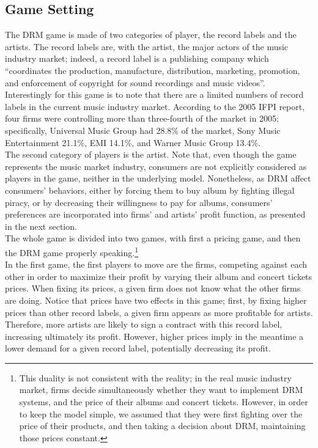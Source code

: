 \documentclass[letter,12pt]{article}
\numberwithin{equation}{section}
\begin{document}
\subsection{Game Setting}

The DRM game is made of two categories of player, the record labels and the artists. The record labels are, with the artist, the major actors of the music industry market; indeed, a record label is a publishing company which ``coordinates the production, manufacture, distribution, marketing, promotion, and enforcement of copyright for sound recordings and music videos''\cite{klein2014}. Interestingly for this game is to note that there are a limited numbers of record labels in the current music industry market. According to the 2005 IFPI report, four firms were controlling more than three-fourth of the market in 2005; specifically, Universal Music Group had 28.8\% of the market, Sony Music Entertainment 21.1\%, EMI 14.1\%, and Warner Music Group 13.4\%.\\

The second category of players is the artist. Note that, even though the game represents the music market industry, consumers are not explicitly considered as players in the game, neither in the underlying model. Nonetheless, as DRM affect consumers' behaviors, either by forcing them to buy album by fighting illegal piracy, or by decreasing their willingness to pay for albums, consumers' preferences are incorporated into firms' and artists' profit function, as presented in the next section.\\

The whole game is divided into two games, with first a pricing game, and then the DRM game properly speaking.\footnote{
This duality is not consistent with the reality; in the real music industry market, firms decide simultaneously whether they want to implement DRM systems, and the price of their albums and concert tickets. However, in order to keep the model simple, we assumed that they were first fighting over the price of their products, and then taking a decision about DRM, maintaining those prices constant.
}\\

In the first game, the first players to move are the firms, competing against each other in order to maximize their profit by varying their album and concert tickets prices. When fixing its prices, a given firm does not know what the other firms are doing. Notice that prices have two effects in this game; first, by fixing higher prices than other record labels, a given firm appears as more profitable for artists. Therefore, more artists are likely to sign a contract with this record label, increasing ultimately its profit. However, higher prices imply in the meantime a lower demand for a given record label, potentially decreasing its profit.\\
\end{document}
